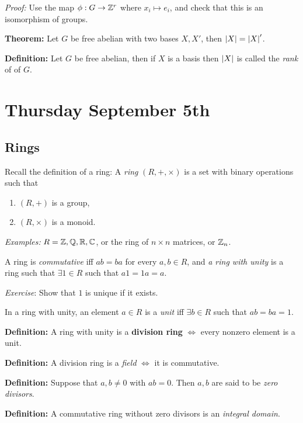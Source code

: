 \emph{Proof:} Use the map \(\phi: G \to {\mathbb{Z}}^r\) where
\(x_i \mapsto e_i\), and check that this is an isomorphism of groups.

\textbf{Theorem:} Let \(G\) be free abelian with two bases \(X, X'\),
then \({\left\lvert {X} \right\rvert} = {\left\lvert {X} \right\rvert}'\).

\textbf{Definition:} Let \(G\) be free abelian, then if \(X\) is a basis
then \({\left\lvert {X} \right\rvert}\) is called the \emph{rank} of of \(G\).

\hypertarget{thursday-september-5th}{%
\section{Thursday September 5th}\label{thursday-september-5th}}

\hypertarget{rings}{%
\subsection{Rings}\label{rings}}

Recall the definition of a ring: A \emph{ring} \((R, +, \times)\) is a
set with binary operations such that

\begin{enumerate}
\def\labelenumi{\arabic{enumi}.}
\tightlist
\item
  \((R, +)\) is a group,
\item
  \((R, \times)\) is a monoid.
\end{enumerate}

\emph{Examples:} \(R = {\mathbb{Z}}, {\mathbb{Q}}, {\mathbb{R}}, {\mathbb{C}}\), or the ring of
\(n\times n\) matrices, or \({\mathbb{Z}}_n\).

A ring is \emph{commutative} iff \(ab = ba\) for every \(a,b\in R\), and
\emph{a ring with unity} is a ring such that \(\exists 1 \in R\) such
that \(a1 = 1a = a\).

\emph{Exercise}: Show that \(1\) is unique if it exists.

In a ring with unity, an element \(a\in R\) is a \emph{unit} iff
\(\exists b\in R\) such that \(ab = ba = 1\).

\textbf{Definition:} A ring with unity is a \textbf{division ring}
\(\iff\) every nonzero element is a unit.

\textbf{Definition:} A division ring is a \emph{field} \(\iff\) it is
commutative.

\textbf{Definition:} Suppose that \(a,b \neq 0\) with \(ab = 0\). Then
\(a,b\) are said to be \emph{zero divisors}.

\textbf{Definition:} A commutative ring without zero divisors is an
\emph{integral domain}.

